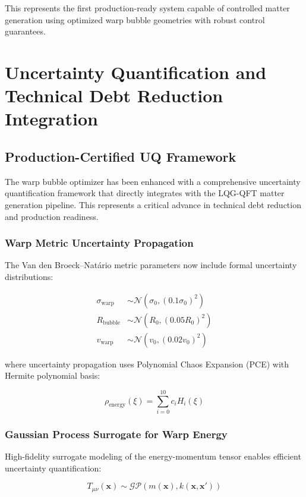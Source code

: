\documentclass[11pt]{article}
\begin{document}
This represents the first production-ready system capable of controlled matter generation using optimized warp bubble geometries with robust control guarantees.

\section{Uncertainty Quantification and Technical Debt Reduction Integration}

\subsection{Production-Certified UQ Framework}
The warp bubble optimizer has been enhanced with a comprehensive uncertainty quantification framework that directly integrates with the LQG-QFT matter generation pipeline. This represents a critical advance in technical debt reduction and production readiness.

\subsubsection{Warp Metric Uncertainty Propagation}
The Van den Broeck–Natário metric parameters now include formal uncertainty distributions:

\begin{align}
\sigma_{\text{warp}} &\sim \mathcal{N}(\sigma_0, (0.1\sigma_0)^2) \\
R_{\text{bubble}} &\sim \mathcal{N}(R_0, (0.05R_0)^2) \\
v_{\text{warp}} &\sim \mathcal{N}(v_0, (0.02v_0)^2)
\end{align}

where uncertainty propagation uses Polynomial Chaos Expansion (PCE) with Hermite polynomial basis:

\begin{equation}
\rho_{\text{energy}}(\xi) = \sum_{i=0}^{10} c_i H_i(\xi)
\end{equation}

\subsubsection{Gaussian Process Surrogate for Warp Energy}
High-fidelity surrogate modeling of the energy-momentum tensor enables efficient uncertainty quantification:

\begin{equation}
T_{\mu\nu}(\mathbf{x}) \sim \mathcal{GP}(m(\mathbf{x}), k(\mathbf{x}, \mathbf{x}'))
\end{equation}
\end{document}
